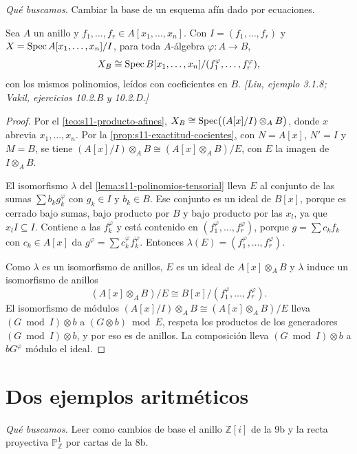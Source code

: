 \emph{Qué buscamos.} Cambiar la base de un esquema afín dado por ecuaciones.

\begin{ejem}
\label{ejem:s11-cambio-base-ecuaciones}
Sea \(A\) un anillo y \(f_1,\ldots,f_r\in A[x_1,\ldots,x_n]\). Con \(I=(f_1,\ldots,f_r)\) y \(X=\operatorname{Spec} A[x_1,\ldots,x_n]/I\), para toda \(A\)-álgebra \(\varphi\colon A\to B\),
\[
 X_B\cong\operatorname{Spec} B[x_1,\ldots,x_n]/(f_1^\varphi,\ldots,f_r^\varphi),
\]
con los mismos polinomios, leídos con coeficientes en \(B\). \emph{[Liu, ejemplo 3.1.8; Vakil, ejercicios 10.2.B y 10.2.D.]}
\end{ejem}
\begin{proof}
Por el \cref{teo:s11-producto-afines}, \(X_B\cong\operatorname{Spec}\bigl((A[x]/I)\otimes_A B\bigr)\), donde \(x\) abrevia \(x_1,\ldots,x_n\). Por la \cref{prop:s11-exactitud-cocientes}, con \(N=A[x]\), \(N'=I\) y \(M=B\), se tiene \((A[x]/I)\otimes_A B\cong(A[x]\otimes_A B)/E\), con \(E\) la imagen de \(I\otimes_A B\).

El isomorfismo \(\lambda\) del \cref{lema:s11-polinomios-tensorial} lleva \(E\) al conjunto de las sumas \(\sum b_k g_k^\varphi\) con \(g_k\in I\) y \(b_k\in B\). Ese conjunto es un ideal de \(B[x]\), porque es cerrado bajo sumas, bajo producto por \(B\) y bajo producto por las \(x_l\), ya que \(x_lI\subseteq I\). Contiene a las \(f_k^\varphi\) y está contenido en \((f_1^\varphi,\ldots,f_r^\varphi)\), porque \(g=\sum c_kf_k\) con \(c_k\in A[x]\) da \(g^\varphi=\sum c_k^\varphi f_k^\varphi\). Entonces \(\lambda(E)=(f_1^\varphi,\ldots,f_r^\varphi)\).

Como \(\lambda\) es un isomorfismo de anillos, \(E\) es un ideal de \(A[x]\otimes_A B\) y \(\lambda\) induce un isomorfismo de anillos
\[
 (A[x]\otimes_A B)/E\cong B[x]/(f_1^\varphi,\ldots,f_r^\varphi).
\]
El isomorfismo de módulos \((A[x]/I)\otimes_A B\cong(A[x]\otimes_A B)/E\) lleva \((G\bmod I)\otimes b\) a \((G\otimes b)\bmod E\), respeta los productos de los generadores \((G\bmod I)\otimes b\), y por eso es de anillos. La composición lleva \((G\bmod I)\otimes b\) a \(bG^\varphi\) módulo el ideal.
\end{proof}

\section{Dos ejemplos aritméticos}
\label{sec:s11-ejemplos-aritmeticos}

\emph{Qué buscamos.} Leer como cambios de base el anillo \(\mathbb Z[i]\) de la 9b y la recta proyectiva \(\mathbb P^1_{\mathbb Z}\) por cartas de la 8b.

